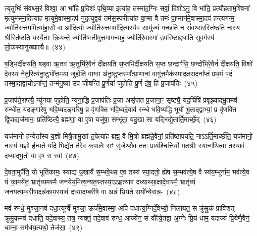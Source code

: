 त्यृ॒तुभिः॑ संवथ्स॒रं विश्वा॒ आ भा॑हि प्र॒दिशः॑ पृथि॒व्या इत्या॑ह॒ तस्मा॑द॒ग्निः सर्वा॒ दिशो\-ऽनु॒ वि भा॑ति॒ प्रत्यौ॑हताम॒श्विना॑ मृ॒त्युम॑स्मा॒दित्या॑ह मृ॒त्युमे॒वास्मा॒दप॑ नुद॒त्युद्व॒यं तम॑स॒स्परीत्या॑ह पा॒प्मा वै तमः॑ पा॒प्मान॑मे॒वास्मा॒दप॑ ह॒न्त्यग॑न्म॒ ज्योति॑रुत्त॒ममित्या॑हा॒सौ वा आ॑दि॒त्यो ज्योति॑रुत्त॒ममा॑दि॒त्यस्यै॒व सायु॑ज्यं गच्छति॒ न सं॑वथ्स॒रस्ति॑ष्ठति॒ नास्य॒ श्रीस्ति॑ष्ठति॒ यस्यै॒ताः क्रि॒यन्ते॒ ज्योति॑ष्मतीमुत्त॒मामन्वा॑ह॒ ज्योति॑रे॒वास्मा॑ उ॒परि॑ष्टाद्दधाति सुव॒र्गस्य॑ लो॒कस्यानु॑ख्यात्यै॥~(४४)\ip

{\anuvakamend[{याव॑न्तो\-ऽस्य मुख॒तश्चित्य॑स्य वर्धयत्यादि॒त्यो᳚\-ऽष्टाविꣳ॑शतिश्च}]}

ष॒ड्भिर्दी᳚क्षयति॒ षड्वा ऋ॒तव॑ ऋ॒तुभि॑रे॒वैनं॑ दीक्षयति स॒प्तभि॑र्दीक्षयति स॒प्त छन्दाꣳ॑सि॒ छन्दो॑भिरे॒वैनं॑ दीक्षयति॒ विश्वे॑ दे॒वस्य॑ ने॒तुरित्य॑नु॒ष्टुभो᳚त्त॒मया॑ जुहोति॒ वाग्वा अ॑नु॒ष्टुप्तस्मा᳚त्प्रा॒णानां॒ वागु॑त्त॒मैक॑स्माद॒क्षरा॒दना᳚प्तं प्रथ॒मं प॒दं तस्मा॒द्यद्वा॒चो\-ऽना᳚प्तं॒ तन्म॑नु॒ष्या॑ उप॑ जीवन्ति पू॒र्णया॑ जुहोति पू॒र्ण इ॑व॒ हि प्र॒जा\-प॑तिः~(४५)\ip

प्र॒जा\-प॑ते॒राप्त्यै॒ न्यू॑नया जुहोति॒ न्यू॑ना॒द्धि प्र॒जा\-प॑तिः प्र॒जा असृ॑जत प्र॒जाना॒ꣳ॒ सृष्ट्यै॒ यद॒र्चिषि॑ प्रवृ॒ञ्ज्याद्भू॒तमव॑ रुन्धीत॒ यदङ्गा॑रेषु भवि॒ष्यदङ्गा॑रेषु॒ प्र वृ॑णक्ति भवि॒ष्यदे॒वाव॑ रुन्धे भवि॒ष्यद्धि भूयो॑ भू॒ताद्द्वाभ्यां॒ प्र वृ॑णक्ति द्वि॒पाद्यज॑मानः॒ प्रति॑ष्ठित्यै॒ ब्रह्म॑णा॒ वा ए॒षा यजु॑षा॒ सम्भृ॑ता॒ यदु॒खा सा यद्भिद्ये॒तार्ति॒मार्च्छे॒द्~(४६)\ip

यज॑मानो ह॒न्येता᳚स्य य॒ज्ञो मित्रै॒तामु॒खां त॒पेत्या॑ह॒ ब्रह्म॒ वै मि॒त्रो ब्रह्म॑न्ने॒वैनां॒ प्रति॑\-ष्ठापयति॒ नाऽऽर्ति॒मार्च्छ॑ति॒ यज॑मानो॒ नास्य॑ य॒ज्ञो ह॑न्यते॒ यदि॒ भिद्ये॑त॒ तैरे॒व क॒पालैः॒ सꣳ सृ॑जे॒थ्सैव ततः॒ प्राय॑श्चित्ति॒र्यो ग॒तश्रीः॒ स्यान्म॑थि॒त्वा तस्याव॑ दध्याद्भू॒तो वा ए॒ष स स्वां~(४७)\ip

दे॒वता॒मुपै॑ति॒ यो भूति॑कामः॒ स्याद्य उ॒खायै॑ स॒म्भवे॒थ्स ए॒व तस्य॑ स्या॒दतो॒ ह्ये॑ष स॒म्भव॑त्ये॒ष वै स्व॑य॒म्भूर्नाम॒ भव॑त्ये॒व यं का॒मये॑त॒ भ्रातृ॑व्यमस्मै जनयेय॒मित्य॒न्यत॒स्तस्या॒\-ऽऽ\-हृत्याव॑ दध्याथ्सा॒क्षादे॒वास्मै॒ भ्रातृ॑व्यं जनयत्यम्ब॒रीषा॒\-दन्न॑काम॒स्याव॑ दध्यादम्ब॒रीषे॒ वा अन्नं॑ भ्रियते॒ सयो᳚न्ये॒वान्न॒-~(४८)\ip

मव॑ रुन्धे॒ मुञ्जा॒नव॑ दधा॒त्यूर्ग्वै मुञ्जा॒ ऊर्ज॑मे॒वास्मा॒ अपि॑ दधात्य॒ग्निर्दे॒वेभ्यो॒ निला॑यत॒ स क्रु॑मु॒कं प्रावि॑शत् क्रुमु॒कमव॑ दधाति॒ यदे॒वास्य॒ तत्र॒ न्य॑क्तं॒ तदे॒वाव॑ रुन्ध॒ आज्ये॑न॒ सं यौ᳚त्ये॒तद्वा अ॒ग्नेः प्रि॒यं धाम॒ यदाज्यं॑ प्रि॒येणै॒वैनं॒ धाम्ना॒ सम॑र्धय॒त्यथो॒ तेज॑सा॒~(४९)\ip

